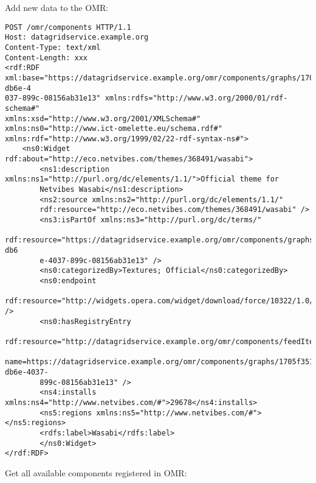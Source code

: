 Add new data to the OMR:

\begin{lstlisting}[style=consola]
POST /omr/components HTTP/1.1
Host: datagridservice.example.org
Content-Type: text/xml
Content-Length: xxx
<rdf:RDF
xml:base="https://datagridservice.example.org/omr/components/graphs/1705f351-db6e-4
037-899c-08156ab31e13" xmlns:rdfs="http://www.w3.org/2000/01/rdf-schema#"
xmlns:xsd="http://www.w3.org/2001/XMLSchema#"
xmlns:ns0="http://www.ict-omelette.eu/schema.rdf#"
xmlns:rdf="http://www.w3.org/1999/02/22-rdf-syntax-ns#">
	<ns0:Widget rdf:about="http://eco.netvibes.com/themes/368491/wasabi">
		<ns1:description xmlns:ns1="http://purl.org/dc/elements/1.1/">Official theme for
		Netvibes Wasabi</ns1:description>
		<ns2:source xmlns:ns2="http://purl.org/dc/elements/1.1/"
		rdf:resource="http://eco.netvibes.com/themes/368491/wasabi" />
		<ns3:isPartOf xmlns:ns3="http://purl.org/dc/terms/"
		rdf:resource="https://datagridservice.example.org/omr/components/graphs/1705f351-db6
		e-4037-899c-08156ab31e13" />
		<ns0:categorizedBy>Textures; Official</ns0:categorizedBy>
		<ns0:endpoint
		rdf:resource="http://widgets.opera.com/widget/download/force/10322/1.0/" />
		<ns0:hasRegistryEntry
		rdf:resource="http://datagridservice.example.org/omr/components/feedItem?
		name=https://datagridservice.example.org/omr/components/graphs/1705f351-db6e-4037-
		899c-08156ab31e13" />
		<ns4:installs xmlns:ns4="http://www.netvibes.com/#">29678</ns4:installs>
		<ns5:regions xmlns:ns5="http://www.netvibes.com/#"></ns5:regions>
		<rdfs:label>Wasabi</rdfs:label>
		</ns0:Widget>
</rdf:RDF>
\end{lstlisting}
Get all available components registered in OMR:


